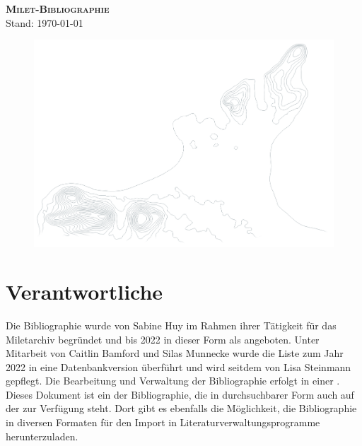 
\begin{titlepage}
    \vspace*{3cm}
\begin{center}
    {\LARGE \textsc{\textbf{Milet-Bibliographie}}}\\
    
    Stand: \today
\end{center}
\vspace*{3cm}
\begin{figure}[h]
    \includegraphics[width=\textwidth]{../data/figures/Gelaende2.png}
\end{figure}

\end{titlepage}

\thispagestyle{empty}



\section*{Verantwortliche}

Die Bibliographie wurde von Sabine Huy im Rahmen ihrer Tätigkeit für das Miletarchiv begründet und bis 2022 in dieser Form als  angeboten. Unter Mitarbeit von Caitlin Bamford und Silas Munnecke wurde die Liste zum Jahr 2022 in eine Datenbankversion überführt und wird seitdem von Lisa Steinmann gepflegt. Die Bearbeitung und Verwaltung der Bibliographie erfolgt in einer . Dieses Dokument ist ein  der Bibliographie, die in durchsuchbarer Form auch auf der  zur Verfügung steht. Dort gibt es ebenfalls die Möglichkeit, die Bibliographie in diversen Formaten für den Import in Literaturverwaltungsprogramme herunterzuladen.\\

